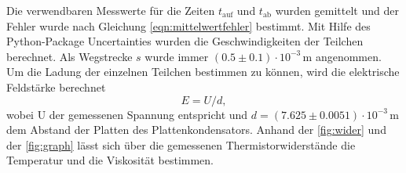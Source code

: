 \vspace{5em}
\begin{table}[H]
	\centering
	\captionsetup{width=0.95\linewidth}
	\caption{Ergebnisse für 14. Tröpfchen. Felder entsprechen jeweils primären, sekundären und tertiären Messgrößen. Hervorgehoben
			 ist der Mittelwert der Laufzeiten. Relative Abweichung zur Bedingung an Geschwindigkeit: $\protect$.}
	
	\label{tab:tropfen_14}
\end{table}

\vspace{5em}
\begin{table}[H]
	\centering
	\captionsetup{width=0.95\linewidth}
	\caption{Ergebnisse für 16. Tröpfchen. Felder entsprechen jeweils primären, sekundären und tertiären Messgrößen. Hervorgehoben
			 ist der Mittelwert der Laufzeiten. Relative Abweichung zur Bedingung an Geschwindigkeit: $\protect$.}
	
	\label{tab:tropfen_16}
\end{table}

\vspace{5em}
\begin{table}[H]
	\centering
	\captionsetup{width=0.95\linewidth}
	\caption{Ergebnisse für 17. Tröpfchen. Felder entsprechen jeweils primären, sekundären und tertiären Messgrößen. Hervorgehoben
			 ist der Mittelwert der Laufzeiten. Relative Abweichung zur Bedingung an Geschwindigkeit: $\protect$.}
	
	\label{tab:tropfen_17}
\end{table}
\vspace{5em}

Die verwendbaren Messwerte für die Zeiten $t_{\text{auf}}$ und $t_{\text{ab}}$ wurden gemittelt und der Fehler wurde nach
Gleichung \eqref{eqn:mittelwertfehler} bestimmt. Mit Hilfe des Python-Package Uncertainties \cite{uncertainties} wurden die Geschwindigkeiten der 
Teilchen berechnet. Als Wegstrecke $s$ wurde immer $(0.5 \pm 0.1) \cdot 10^{-3} \, \mathrm{m} $ angenommen. Um die Ladung der 
einzelnen Teilchen bestimmen zu können, wird die elektrische Feldstärke berechnet
\begin{equation*} 
    E = U/d,
\end{equation*}
wobei U der gemessenen Spannung entspricht und $d = (7.625 \pm 0.0051) \cdot 10^{-3}\,\mathrm{m} $ dem Abstand der Platten des Plattenkondensators.
Anhand der \autoref{fig:wider} und der \autoref{fig:graph} lässt sich über die gemessenen Thermistorwiderstände die Temperatur und die Viskosität bestimmen.

